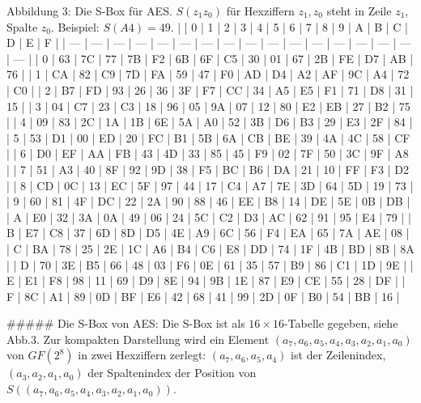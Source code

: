 \documentclass[a4paper]{article}
\begin{document}
\begin{multicols}{3}
Abbildung 3: Die S-Box für AES. $S(z_1 z_0)$ für Hexziffern $z_1,z_0$ steht in Zeile $z_1$, Spalte $z_0$. Beispiel: $S(A4)=49$.
|     | 0   | 1   | 2   | 3   | 4   | 5   | 6   | 7   | 8   | 9   | A   | B   | C   | D   | E   | F   |
| --- | --- | --- | --- | --- | --- | --- | --- | --- | --- | --- | --- | --- | --- | --- | --- | --- |
| 0   | 63  | 7C  | 77  | 7B  | F2  | 6B  | 6F  | C5  | 30  | 01  | 67  | 2B  | FE  | D7  | AB  | 76  |
| 1   | CA  | 82  | C9  | 7D  | FA  | 59  | 47  | F0  | AD  | D4  | A2  | AF  | 9C  | A4  | 72  | C0  |
| 2   | B7  | FD  | 93  | 26  | 36  | 3F  | F7  | CC  | 34  | A5  | E5  | F1  | 71  | D8  | 31  | 15  |
| 3   | 04  | C7  | 23  | C3  | 18  | 96  | 05  | 9A  | 07  | 12  | 80  | E2  | EB  | 27  | B2  | 75  |
| 4   | 09  | 83  | 2C  | 1A  | 1B  | 6E  | 5A  | A0  | 52  | 3B  | D6  | B3  | 29  | E3  | 2F  | 84  |
| 5   | 53  | D1  | 00  | ED  | 20  | FC  | B1  | 5B  | 6A  | CB  | BE  | 39  | 4A  | 4C  | 58  | CF  |
| 6   | D0  | EF  | AA  | FB  | 43  | 4D  | 33  | 85  | 45  | F9  | 02  | 7F  | 50  | 3C  | 9F  | A8  |
| 7   | 51  | A3  | 40  | 8F  | 92  | 9D  | 38  | F5  | BC  | B6  | DA  | 21  | 10  | FF  | F3  | D2  |
| 8   | CD  | 0C  | 13  | EC  | 5F  | 97  | 44  | 17  | C4  | A7  | 7E  | 3D  | 64  | 5D  | 19  | 73  |
| 9   | 60  | 81  | 4F  | DC  | 22  | 2A  | 90  | 88  | 46  | EE  | B8  | 14  | DE  | 5E  | 0B  | DB  |
| A   | E0  | 32  | 3A  | 0A  | 49  | 06  | 24  | 5C  | C2  | D3  | AC  | 62  | 91  | 95  | E4  | 79  |
| B   | E7  | C8  | 37  | 6D  | 8D  | D5  | 4E  | A9  | 6C  | 56  | F4  | EA  | 65  | 7A  | AE  | 08  |
| C   | BA  | 78  | 25  | 2E  | 1C  | A6  | B4  | C6  | E8  | DD  | 74  | 1F  | 4B  | BD  | 8B  | 8A  |
| D   | 70  | 3E  | B5  | 66  | 48  | 03  | F6  | 0E  | 61  | 35  | 57  | B9  | 86  | C1  | 1D  | 9E  |
| E   | E1  | F8  | 98  | 11  | 69  | D9  | 8E  | 94  | 9B  | 1E  | 87  | E9  | CE  | 55  | 28  | DF  |
| F   | 8C  | A1  | 89  | 0D  | BF  | E6  | 42  | 68  | 41  | 99  | 2D  | 0F  | B0  | 54  | BB  | 16  |

##### Die S-Box von AES:
Die S-Box ist als $16\times 16$-Tabelle gegeben, siehe Abb.3. Zur kompakten Darstellung wird ein Element $(a_7,a_6,a_5,a_4,a_3,a_2,a_1,a_0)$ von $GF(2^8)$ in zwei Hexziffern zerlegt: $(a_7,a_6,a_5,a_4)$ ist der Zeilenindex, $(a_3,a_2,a_1,a_0)$ der Spaltenindex der Position von $S((a_7,a_6,a_5,a_4,a_3,a_2,a_1,a_0))$.


\end{multicols}
\end{document}
